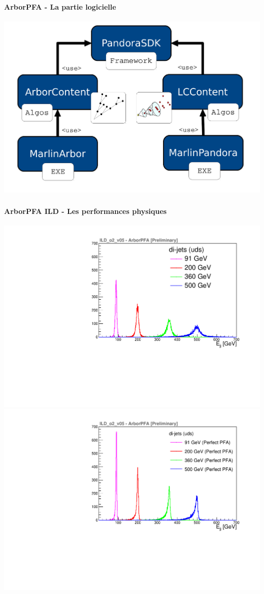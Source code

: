 \documentclass[8pt]{beamer}
\begin{document}
  \begin{frame}
  \frametitle{\backup}
  \framesubtitle{ArborPFA - La partie logicielle}
    \begin{center}
      \includegraphics[width=\linewidth]{ArborSoftwareView.pdf}
    \end{center}
  \end{frame}

  \begin{frame}
  \frametitle{\backup}
  \framesubtitle{ArborPFA ILD - Les performances physiques}
    \begin{center}
      \includegraphics[width=0.52\linewidth]{ILDArborPFA_ERec_NoNeutralHadron.pdf}
      \includegraphics[width=0.52\linewidth]{ILDArborPFA_PerfectERec_NoNeutralHadron.pdf}
    \end{center}
  \end{frame}
\end{document}
